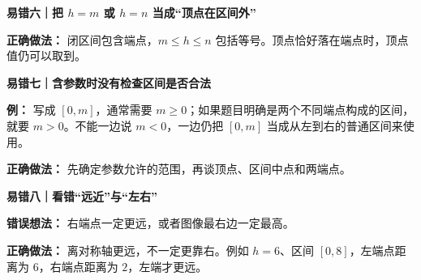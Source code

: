 \clearpage
\begin{trapbox}
\textbf{\textcolor{CTrap}{易错六｜把 $h=m$ 或 $h=n$ 当成“顶点在区间外”}}



\textbf{正确做法：} 闭区间包含端点，$m\le h\le n$ 包括等号。顶点恰好落在端点时，顶点值仍可以取到。

\medskip

\end{trapbox}
\clearpage
\begin{trapbox}
\textbf{\textcolor{CTrap}{易错七｜含参数时没有检查区间是否合法}}



\textbf{例：} 写成 $[0,m]$，通常需要 $m\ge0$；如果题目明确是两个不同端点构成的区间，就要 $m>0$。不能一边说 $m<0$，一边仍把 $[0,m]$ 当成从左到右的普通区间来使用。

\textbf{正确做法：} 先确定参数允许的范围，再谈顶点、区间中点和两端点。

\medskip

\end{trapbox}
\clearpage
\begin{trapbox}
\textbf{\textcolor{CTrap}{易错八｜看错“远近”与“左右”}}



\textbf{错误想法：} 右端点一定更远，或者图像最右边一定最高。

\textbf{正确做法：} 离对称轴更远，不一定更靠右。例如 $h=6$、区间 $[0,8]$，左端点距离为 $6$，右端点距离为 $2$，左端才更远。
\end{trapbox}
